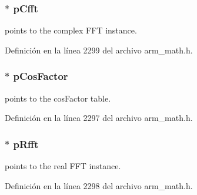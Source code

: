 \subsubsection[{\texorpdfstring{p\+Cfft}{pCfft}}]{$\ast$ p\+Cfft}\hypertarget{structarm__dct4__instance__q31_a0b1f4a05c1824bab3b9bd837a260232a}{}\label{structarm__dct4__instance__q31_a0b1f4a05c1824bab3b9bd837a260232a}
points to the complex F\+FT instance. 

Definición en la línea 2299 del archivo arm\+\_\+math.\+h.

\subsubsection[{\texorpdfstring{p\+Cos\+Factor}{pCosFactor}}]{$\ast$ p\+Cos\+Factor}\hypertarget{structarm__dct4__instance__q31_af06acf18dc6547fc29aba2eb68cc63f0}{}\label{structarm__dct4__instance__q31_af06acf18dc6547fc29aba2eb68cc63f0}
points to the cos\+Factor table. 

Definición en la línea 2297 del archivo arm\+\_\+math.\+h.

\subsubsection[{\texorpdfstring{p\+Rfft}{pRfft}}]{$\ast$ p\+Rfft}\hypertarget{structarm__dct4__instance__q31_a16c74f8496e1691e62da3c57e0c676eb}{}\label{structarm__dct4__instance__q31_a16c74f8496e1691e62da3c57e0c676eb}
points to the real F\+FT instance. 

Definición en la línea 2298 del archivo arm\+\_\+math.\+h.

